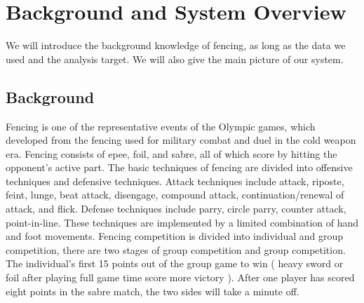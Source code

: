 \documentclass[journal]{vgtc}                %
\begin{document}
\section{Background and System Overview}
We will introduce the background knowledge of fencing, as long as the data we used and the analysis target. We will also give the main picture of our system.
\subsection{Background}
Fencing is one of the representative events of the Olympic games, which developed from the fencing used for military combat and duel in the cold weapon era.
Fencing consists of epee, foil, and sabre, all of which score by hitting the opponent's active part.
The basic techniques of fencing are divided into offensive techniques and defensive techniques.
Attack techniques include attack, riposte, feint, lunge, beat attack, disengage, compound attack, continuation/renewal of attack, and flick.
Defense techniques include parry, circle parry, counter attack, point-in-line.
These techniques are implemented by a limited combination of hand and foot movements.
Fencing competition is divided into individual and group competition, there are two stages of group competition and group competition.
The individual's first 15 points out of the group game to win ( heavy sword or foil after playing full game time score more victory ).
After one player has scored eight points in the sabre match, the two sides will take a minute off.


	
\end{document}
